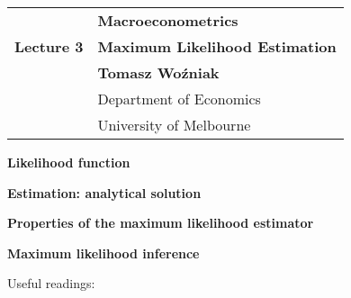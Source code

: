 \documentclass[notes,blackandwhite,mathsans]{beamer}
\begin{document}




{
\begin{frame}

\vspace{1cm}
\begin{tabular}{rl}
&\textbf{\LARGE\color{mcxs1} Macroeconometrics}\\[8ex]
\textbf{\Large Lecture 3}&\textbf{\Large\color{mcxs5}Maximum Likelihood Estimation}\\[19ex]
&\textbf{Tomasz Wo\'zniak}\\[1ex]
&{\small\color{mcxs5} Department of Economics}\\
&{\small\color{mcxs5}University of Melbourne}
\end{tabular}

\end{frame}
}



{
\begin{frame}

\vspace{1.5cm} \textbf{\color{mcxs3}Likelihood function}

\bigskip\textbf{\color{mcxs1}Estimation: analytical solution}

\bigskip\textbf{\color{mcxs3}Properties of the maximum likelihood estimator}

\bigskip\textbf{\color{mcxs3}Maximum likelihood inference}


\vspace{1cm} Useful readings: \\ \footnotesize
{}

\end{frame}
}
\end{document}
